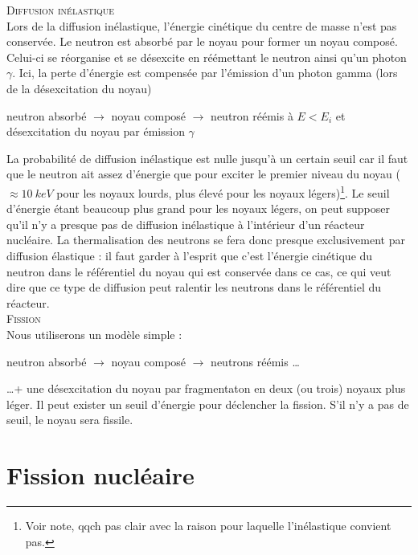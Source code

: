 \textsc{Diffusion inélastique}\\
Lors de la diffusion inélastique, l'énergie cinétique du centre de masse n'est pas conservée.
Le neutron est absorbé par le noyau pour former un noyau composé. Celui-ci se réorganise et
se désexcite en réémettant le neutron ainsi qu'un photon $\gamma$.
Ici, la perte d'énergie est compensée par l'émission d'un photon gamma (lors de la désexcitation 
du noyau)
\begin{center}
neutron absorbé $\longrightarrow$ noyau composé $\longrightarrow$ neutron réémis à $E<E_i$
et désexcitation du noyau par émission $\gamma$
\end{center}
La probabilité de diffusion inélastique est nulle jusqu'à un certain seuil car il faut que le neutron
ait assez d'énergie que pour exciter le premier niveau du noyau ($\approx 10\ keV$ pour les 
noyaux lourds, plus élevé pour les noyaux légers)\footnote{Voir note, qqch pas clair avec la 
raison pour laquelle l'inélastique convient pas.}. 
Le seuil d'énergie étant beaucoup plus grand pour les noyaux légers, on peut supposer qu'il n'y
a presque pas de diffusion inélastique à l'intérieur d'un réacteur nucléaire.
La thermalisation des neutrons se fera donc presque exclusivement par diffusion élastique : il faut garder
à l'esprit que c'est l'énergie cinétique du neutron dans le référentiel du noyau qui est conservée dans ce
cas, ce qui veut dire que ce type de diffusion peut ralentir les neutrons dans le référentiel du réacteur.\\

\textsc{Fission}\\
Nous utiliserons un modèle simple :
\begin{center}
neutron absorbé $\longrightarrow$ noyau composé $\longrightarrow$ neutrons réémis \dots
\end{center}
\dots + une désexcitation du noyau par fragmentaton en deux (ou trois) noyaux plus léger. Il 
peut exister un seuil d'énergie pour déclencher la fission. S'il n'y a pas de seuil, le noyau
sera fissile.




\newpage
\section{Fission nucléaire}
